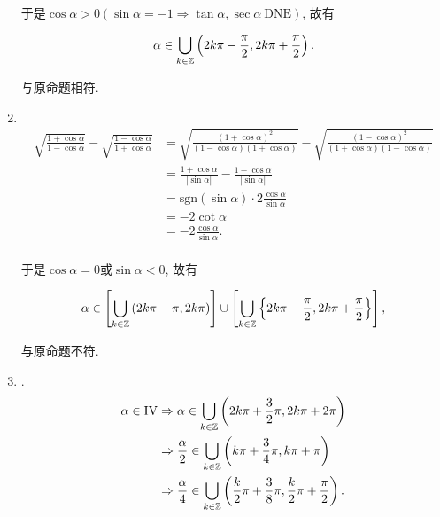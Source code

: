 \documentclass[8pt]{article}
\begin{document}
\begin{enumerate}[label=(\arabic*)]
					于是$\cos \alpha > 0 (\sin \alpha = -1 \Rightarrow \tan \alpha, \sec\alpha \ \mathrm{DNE})$, 故有

					$$\alpha \in \bigcup_{k\in\mathbb{Z}} \left(2k\pi - \frac{\pi}{2}, 2k\pi + \frac{\pi}{2}\right),$$

					与原命题相符.

				\item {}
					~\\

					\begin{align*}
						\sqrt{\frac{1+\cos\alpha}{1-\cos\alpha}}-\sqrt{\frac{1-\cos\alpha}{1+\cos\alpha}} &= \sqrt{\frac{(1+\cos\alpha)^2}{(1-\cos\alpha)(1+\cos\alpha)}} - \sqrt{\frac{(1-\cos\alpha)^2}{(1+\cos\alpha)(1-\cos\alpha)}}\\
						&= \frac{1+\cos\alpha}{\left\vert\sin\alpha\right\vert} - \frac{1-\cos\alpha}{\left\vert\sin\alpha\right\vert}\\
						&= \mathrm{sgn}(\sin\alpha) \cdot 2 \frac{\cos\alpha}{\sin\alpha}\\
						&= -2\cot\alpha\\
						&= -2\frac{\cos\alpha}{\sin\alpha}.\\
					\end{align*}

					于是$\cos\alpha = 0$或$\sin\alpha < 0$, 故有

					$$\alpha \in \left[\bigcup_{k\in\mathbb{Z}} \left(2k\pi - \pi, 2k\pi\right)\right] \cup \left[\bigcup_{k\in\mathbb{Z}} \left\{2k\pi - \frac{\pi}{2}, 2k\pi + \frac{\pi}{2}\right\}\right],$$

					与原命题不符.

				\item {}.
					~\\

					\begin{align*}
					\alpha \in \mathrm{IV} &\Rightarrow \alpha \in \bigcup_{k\in\mathbb{Z}} \left(2k\pi+\frac{3}{2}\pi, 2k\pi + 2\pi\right)\\
					&\Rightarrow \frac{\alpha}{2} \in \bigcup_{k\in\mathbb{Z}} \left(k\pi+\frac{3}{4}\pi, k\pi + \pi\right)\\
					&\Rightarrow \frac{\alpha}{4} \in \bigcup_{k\in\mathbb{Z}} \left(\frac{k}{2}\pi+\frac{3}{8}\pi, \frac{k}{2}\pi + \frac{\pi}{2}\right).
					\end{align*}


\end{enumerate}
\end{document}

